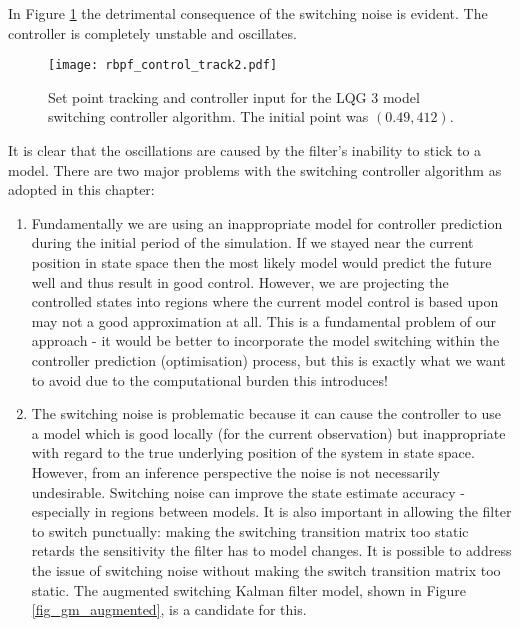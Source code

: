 In Figure \ref{fig_rbpf_control_track2} the detrimental consequence of the switching noise is evident. The controller is completely unstable and oscillates.
\begin{figure}[H] 
\centering
\texttt{[image: rbpf\_control\_track2.pdf]}
\caption{Set point tracking and controller input for the LQG 3 model switching controller algorithm. The initial point was $(0.49, 412)$.}
\label{fig_rbpf_control_track2}
\end{figure}
It is clear that the oscillations are caused by the filter's inability to stick to a model. There are two major problems with the switching controller algorithm as adopted in this chapter:
\begin{enumerate}
\item
Fundamentally we are using an inappropriate model for controller prediction during the initial period of the simulation. If we stayed near the current position in state space then the most likely model would predict the future well and thus result in good control. However, we are projecting the controlled states into regions where the current model control is based upon may not a good approximation at all. This is a fundamental problem of our approach - it would be better to incorporate the model switching within the controller prediction (optimisation) process, but this is exactly what we want to avoid due to the computational burden this introduces!
\item
The switching noise is problematic because it can cause the controller to use a model which is good locally (for the current observation) but inappropriate with regard to the true underlying position of the system in state space. However, from an inference perspective the noise is not necessarily undesirable. Switching noise can improve the state estimate accuracy - especially in regions between models. It is also important in allowing the filter to switch punctually: making the switching transition matrix too static retards the sensitivity the filter has to model changes. It is possible to address the issue of switching noise without making the switch transition matrix too static. The augmented switching Kalman filter model, shown in Figure \ref{fig_gm_augmented}, is a candidate for this.
\begin{figure}[H] 
\centering
{}
\end{figure}
\end{enumerate}
